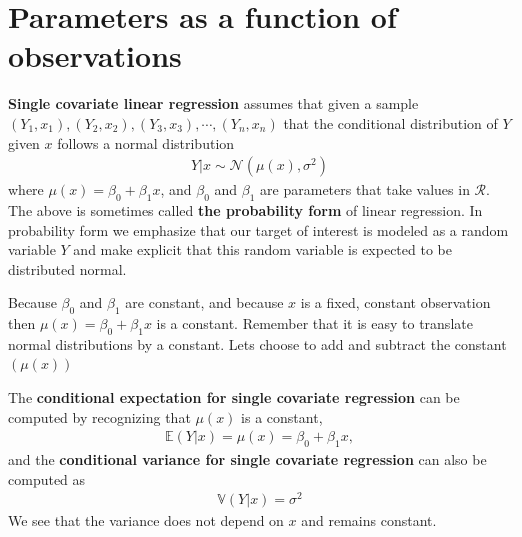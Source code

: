 \section{Parameters as a function of observations}\label{intro}

\textbf{Single covariate linear regression} assumes that given a sample $(Y_{1}, x_{1}), (Y_{2}, x_{2}), (Y_{3}, x_{3}), \cdots, (Y_{n}, x_{n}) $ that the conditional distribution of $Y$ given $x$ follows a normal distribution
\begin{align}
    Y | x \sim \mathcal{N}\left( \mu(x), \sigma^{2} \right)
\end{align}
where $\mu(x) = \beta_{0} + \beta_{1} x$, and $\beta_{0}$ and $\beta_{1}$ are parameters that take values in $\mathcal{R}$.
The above is sometimes called \textbf{the probability form} of linear regression.
In probability form we emphasize that our target of interest is modeled as a random variable $Y$ and make explicit that this random variable is expected to be distributed normal.

Because $\beta_{0}$ and $\beta_{1}$ are constant, and because $x$ is a fixed, constant observation then $\mu(x) = \beta_{0} + \beta_{1}x$ is a constant.
Remember that it is easy to translate normal distributions by a constant.
Lets choose to add and subtract the constant $(\mu(x))$

The \textbf{conditional expectation for single covariate regression} can be computed by recognizing that $\mu(x)$ is a constant, 
\begin{align}
    \mathbb{E}(Y|x) = \mu(x) = \beta_{0} + \beta_{1}x,
\end{align}
and the \textbf{conditional variance for single covariate regression} can also be computed as 
\begin{align}
    \mathbb{V}(Y|x) = \sigma^{2}
\end{align}
We see that the variance does not depend on $x$ and remains constant.


